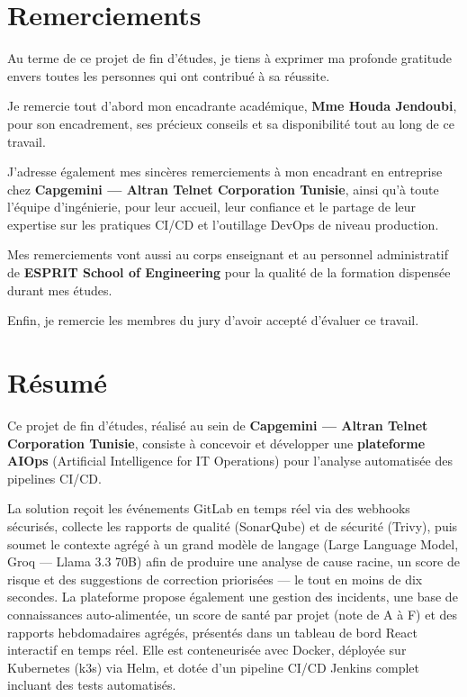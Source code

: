 \documentclass[12pt,a4paper,oneside]{report}
\begin{document}
\chapter*{Remerciements}\thispagestyle{plain}
Au terme de ce projet de fin d'études, je tiens à exprimer ma profonde gratitude envers toutes les personnes qui ont contribué à sa réussite.

Je remercie tout d'abord mon encadrante académique, \textbf{Mme Houda Jendoubi}, pour son encadrement, ses précieux conseils et sa disponibilité tout au long de ce travail.

J'adresse également mes sincères remerciements à mon encadrant en entreprise chez \textbf{Capgemini --- Altran Telnet Corporation Tunisie}, ainsi qu'à toute l'équipe d'ingénierie, pour leur accueil, leur confiance et le partage de leur expertise sur les pratiques CI/CD et l'outillage DevOps de niveau production.

Mes remerciements vont aussi au corps enseignant et au personnel administratif de \textbf{ESPRIT School of Engineering} pour la qualité de la formation dispensée durant mes études.

Enfin, je remercie les membres du jury d'avoir accepté d'évaluer ce travail.

\chapter*{Résumé}\thispagestyle{plain}
Ce projet de fin d'études, réalisé au sein de \textbf{Capgemini --- Altran Telnet Corporation Tunisie}, consiste à concevoir et développer une \textbf{plateforme AIOps} (Artificial Intelligence for IT Operations) pour l'analyse automatisée des pipelines CI/CD.

La solution reçoit les événements GitLab en temps réel via des webhooks sécurisés, collecte les rapports de qualité (SonarQube) et de sécurité (Trivy), puis soumet le contexte agrégé à un grand modèle de langage (Large Language Model, Groq --- Llama 3.3 70B) afin de produire une analyse de cause racine, un score de risque et des suggestions de correction priorisées --- le tout en moins de dix secondes. La plateforme propose également une gestion des incidents, une base de connaissances auto-alimentée, un score de santé par projet (note de A à F) et des rapports hebdomadaires agrégés, présentés dans un tableau de bord React interactif en temps réel. Elle est conteneurisée avec Docker, déployée sur Kubernetes (k3s) via Helm, et dotée d'un pipeline CI/CD Jenkins complet incluant des tests automatisés.
\end{document}
